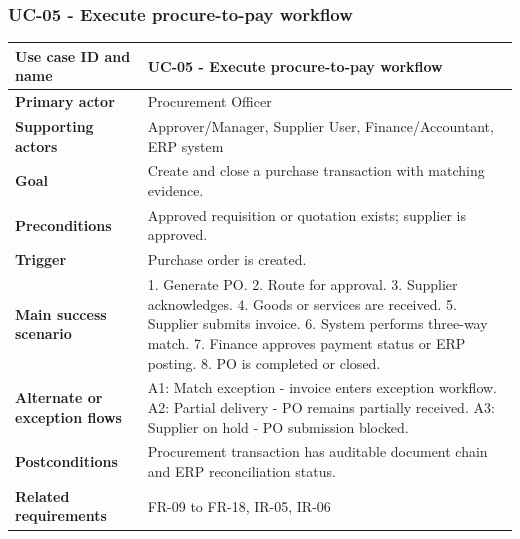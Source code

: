 \documentclass[11pt,a4paper]{article}
\begin{document}
\subsubsection{UC-05 - Execute procure-to-pay workflow}
\begin{footnotesize}
\begin{longtable}{@{}p{}p{}@{}}
\rowcolor{gray!10}\textbf{Use case ID and name} & UC-05 - Execute procure-to-pay workflow \\ \hline
\rowcolor{gray!10}\textbf{Primary actor} & Procurement Officer \\ \hline
\rowcolor{gray!10}\textbf{Supporting actors} & Approver/Manager, Supplier User, Finance/Accountant, ERP system \\ \hline
\rowcolor{gray!10}\textbf{Goal} & Create and close a purchase transaction with matching evidence. \\ \hline
\rowcolor{gray!10}\textbf{Preconditions} & Approved requisition or quotation exists; supplier is approved. \\ \hline
\rowcolor{gray!10}\textbf{Trigger} & Purchase order is created. \\ \hline
\rowcolor{gray!10}\textbf{Main success scenario} & 1. Generate PO. 2. Route for approval. 3. Supplier acknowledges. 4. Goods or services are received. 5. Supplier submits invoice. 6. System performs three-way match. 7. Finance approves payment status or ERP posting. 8. PO is completed or closed. \\ \hline
\rowcolor{gray!10}\textbf{Alternate or exception flows} & A1: Match exception - invoice enters exception workflow. A2: Partial delivery - PO remains partially received. A3: Supplier on hold - PO submission blocked. \\ \hline
\rowcolor{gray!10}\textbf{Postconditions} & Procurement transaction has auditable document chain and ERP reconciliation status. \\ \hline
\rowcolor{gray!10}\textbf{Related requirements} & FR-09 to FR-18, IR-05, IR-06 \\ \hline
\end{longtable}
\end{footnotesize}
\end{document}
